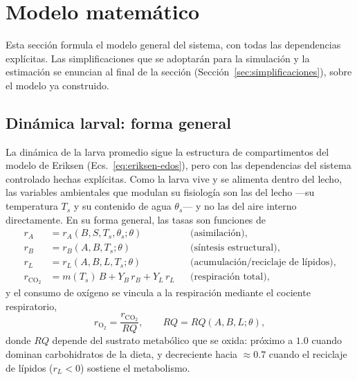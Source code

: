 \section{Modelo matemático}\label{sec:modelo-general}


Esta sección formula el modelo general del sistema, con todas las
dependencias explícitas. Las simplificaciones que se adoptarán para la
simulación y la estimación se enuncian al final de la sección
(Sección~\ref{sec:simplificaciones}), sobre el modelo ya construido.

\subsection{Din\'amica larval: forma general}
\label{sec:larval-general}

La din\'amica de la larva promedio sigue la estructura de compartimentos del modelo de Eriksen (Ecs.~\eqref{eq:eriksen-edos}), pero con las dependencias del sistema controlado hechas expl\'icitas. Como la larva vive y se alimenta dentro del lecho, las variables ambientales que modulan su fisiolog\'ia son las del lecho ---su temperatura $T_s$ y su contenido de agua $\theta_s$--- y no las del aire interno directamente. En su forma general, las tasas son funciones de
\begin{align}
r_A &= r_A(B, S, T_s, \theta_s; \theta) && \text{(asimilaci\'on)}, \label{eq:ra-general}\\
r_B &= r_B(A, B, T_s; \theta) && \text{(s\'intesis estructural)}, \label{eq:rb-general}\\
r_L &= r_L(A, B, L, T_s; \theta) && \text{(acumulaci\'on/reciclaje de l\'ipidos)}, \label{eq:rl-general}\\
r_{\mathrm{CO_2}} &= m(T_s)\,B + Y_B\,r_B + Y_L\,r_L && \text{(respiraci\'on total)}, \label{eq:rco2-general}
\end{align}
y el consumo de ox\'igeno se vincula a la respiraci\'on mediante el cociente respiratorio,
\begin{equation}
r_{\mathrm{O_2}} = \frac{r_{\mathrm{CO_2}}}{RQ}, \qquad RQ = RQ(A, B, L; \theta),
\label{eq:ro2-general}
\end{equation}
donde $RQ$ depende del sustrato metab\'olico que se oxida: pr\'oximo a $1.0$ cuando dominan carbohidratos de la dieta, y decreciente hacia $\approx 0.7$ cuando el reciclaje de l\'ipidos ($r_L < 0$) sostiene el metabolismo.

